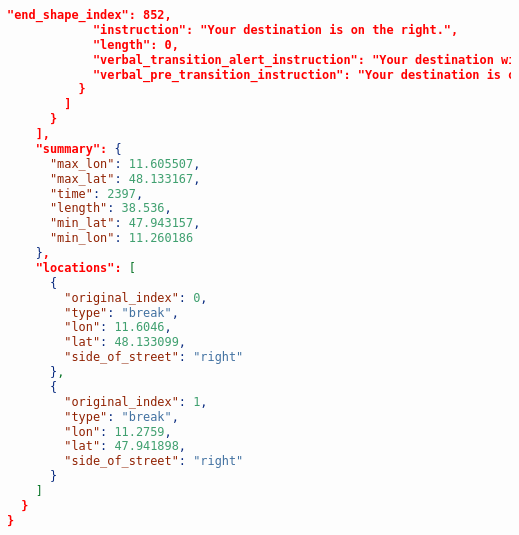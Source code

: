 \begin{lstlisting}[language=json,breaklines=true]
            "end_shape_index": 852,
            "instruction": "Your destination is on the right.",
            "length": 0,
            "verbal_transition_alert_instruction": "Your destination will be on the right.",
            "verbal_pre_transition_instruction": "Your destination is on the right."
          }
        ]
      }
    ],
    "summary": {
      "max_lon": 11.605507,
      "max_lat": 48.133167,
      "time": 2397,
      "length": 38.536,
      "min_lat": 47.943157,
      "min_lon": 11.260186
    },
    "locations": [
      {
        "original_index": 0,
        "type": "break",
        "lon": 11.6046,
        "lat": 48.133099,
        "side_of_street": "right"
      },
      {
        "original_index": 1,
        "type": "break",
        "lon": 11.2759,
        "lat": 47.941898,
        "side_of_street": "right"
      }
    ]
  }
}
\end{lstlisting}